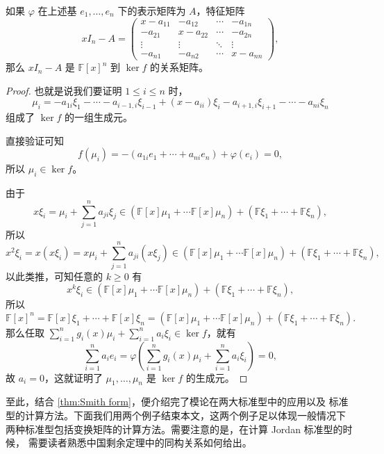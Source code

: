 \documentclass[fontset=none,zihao=-4]{Notes}
\begin{document}
\begin{proposition}\label{prop:characteristic matrix as relation matrix}
  如果 $\varphi$ 在上述基 $e_1,\dots,e_n$ 下的表示矩阵为 $A$，特征矩阵
  \[
    xI_n-A=
    \begin{pmatrix}
      x-a_{11} & -a_{12} & \cdots & -a_{1n}\\
      -a_{21} & x-a_{22} & \cdots & -a_{2n}\\
      \vdots & \vdots & \ddots & \vdots \\
      -a_{n1} & -a_{n2} & \cdots & x-a_{nn}
    \end{pmatrix}  ,
  \]
  那么 $xI_n-A$ 是 $\mathbb{F}[x]^n$ 到 $\ker f$ 的关系矩阵。
\end{proposition}
\begin{proof}
  也就是说我们要证明 $1\leq i\leq n$ 时，
  \[
    \mu_i=-a_{1i}\xi_1-\cdots-a_{i-1,i}\xi_{i-1}+(x-a_{ii})\xi_i-a_{i+1,i}\xi_{i+1}
    -\cdots-a_{ni}\xi_n  
  \]
  组成了 $\ker f$ 的一组生成元。

  直接验证可知
  \[
    f(\mu_i)=-(a_{1i}e_1+\cdots+a_{ni}e_n)+\varphi(e_i)=0,  
  \]
  所以 $\mu_i\in\ker f$。

  由于 
  \[
    x\xi_i=\mu_i+\sum_{j=1}^na_{ji}\xi_j\in 
    (\mathbb{F}[x]\mu_1+\cdots \mathbb{F}[x]\mu_n)+(\mathbb{F}\xi_1+\cdots+\mathbb{F}\xi_n),
  \]
  所以
  \[
    x^2\xi_i=x(x\xi_i)=  x\mu_i+\sum_{j=1}^na_{ji}(x\xi_j)
    \in (\mathbb{F}[x]\mu_1+\cdots \mathbb{F}[x]\mu_n)+(\mathbb{F}\xi_1+\cdots+\mathbb{F}\xi_n),
  \]
  以此类推，可知任意的 $k\geq 0$ 有
  \[
    x^k\xi_i\in   (\mathbb{F}[x]\mu_1+\cdots \mathbb{F}[x]\mu_n)+(\mathbb{F}\xi_1+\cdots+\mathbb{F}\xi_n),
  \]
  所以
  \[
    \mathbb{F}[x]^n=\mathbb{F}[x]\xi_1+\cdots+\mathbb{F}[x]\xi_n
    =   (\mathbb{F}[x]\mu_1+\cdots \mathbb{F}[x]\mu_n)+(\mathbb{F}\xi_1+\cdots+\mathbb{F}\xi_n).
  \]
  那么任取 $\sum_{i=1}^ng_i(x)\mu_i+\sum_{i=1}^n a_i\xi_i\in \ker f$，就有
  \[
    \sum_{i=1}^n a_ie_i=\varphi\left(\sum_{i=1}^ng_i(x)\mu_i+\sum_{i=1}^n a_i\xi_i\right) =0,
  \]
  故 $a_i=0$，这就证明了 $\mu_1,\dots,\mu_n$ 是 $\ker f$ 的生成元。
\end{proof}

至此，结合 \autoref{thm:Smith form}，便介绍完了模论在两大标准型中的应用以及
标准型的计算方法。下面我们用两个例子结束本文，这两个例子足以体现一般情况下
两种标准型包括变换矩阵的计算方法。需要注意的是，在计算 Jordan 标准型的时候，
需要读者熟悉中国剩余定理中的同构关系如何给出。
\end{document}

